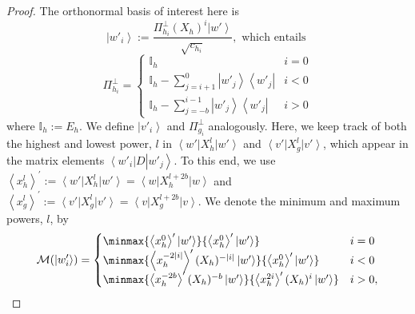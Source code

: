 \documentclass{article}
\begin{document}
\begin{proof}
  The orthonormal basis
  of interest here is
  \begin{equation}
    \left|w'_{i}\right\rangle :=\frac{\Pi_{h_{i}}^{\perp}(X_{h})^{i}\left|w'\right\rangle }{\sqrt{c_{h_{i}}}}, \text{ which entails }\label{eq:alignedBalancedMonomialVectors}
  \end{equation}
  \begin{equation}
    \Pi_{h_{i}}^{\perp}=\begin{cases}
      \mathbb{I}_{h}                                                                       & i=0 \\
      \mathbb{I}_{h}-\sum_{j=i+1}^{0}\left|w'_{j}\right\rangle \left\langle w'_{j}\right|  & i<0 \\
      \mathbb{I}_{h}-\sum_{j=-b}^{i-1}\left|w'_{j}\right\rangle \left\langle w'_{j}\right| & i>0
    \end{cases}\label{eq:alignedBalancedMonomialProjectors}
  \end{equation}
  where $\mathbb{I}_{h}:=E_{h}$. We define $\left|v'_{i}\right\rangle $
  and $\Pi_{g_{i}}^{\perp}$ analogously. Here, we keep
  track of both the highest and lowest power, $l$ in $\left\langle w'\right|X_{h}^{l}\left|w'\right\rangle $
  and $\left\langle v'\right|X_{g}^{l}\left|v'\right\rangle $, which
  appear in the matrix elements $\left\langle w'_{i}\right|D\left|w'_{j}\right\rangle $.
  To this end, we use $\left\langle x_{h}^{l}\right\rangle ^{\prime}:=\left\langle w'\right|X_{h}^{l}\left|w'\right\rangle =\left\langle w\right|X_{h}^{l+2b}\left|w\right\rangle $
  and $\left\langle x_{g}^{l}\right\rangle ^{\prime}:=\left\langle v'\right|X_{g}^{l}\left|v'\right\rangle =\left\langle v\right|X_{g}^{l+2b}\left|v\right\rangle $.
  We denote the minimum and maximum powers, $l$, by
  \begin{displaymath}
    \mathcal{M}(\left|w'_{i}\right\rangle )=\begin{cases}
      \minmax{\left\langle x_{h}^{0}\right\rangle ^{\prime}\left|w'\right\rangle }{\left\langle x_{h}^{0}\right\rangle ^{\prime}\left|w'\right\rangle }                           & i=0  \\
      \minmax{\left\langle x_{h}^{-2|i|}\right\rangle ^{\prime}(X_{h})^{-|i|}\left|w'\right\rangle }{\left\langle x_{h}^{0}\right\rangle ^{\prime}\left|w'\right\rangle }         & i<0  \\
      \minmax{\left\langle x_{h}^{-2b}\right\rangle ^{\prime}(X_{h})^{-b}\left|w'\right\rangle }{\left\langle x_{h}^{2i}\right\rangle ^{\prime}(X_{h})^{i}\left|w'\right\rangle } & i>0,

\end{cases}
\end{displaymath}
\end{proof}
\end{document}
